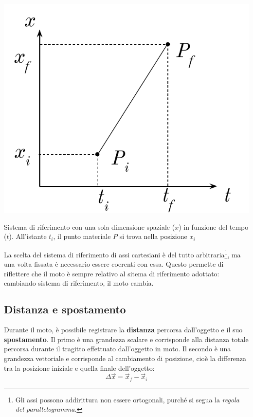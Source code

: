 \begin{marginfigure}
    \centering
    \includegraphics[width = \marginparwidth]{figures/puntomateriale.pdf}
    \caption{Sistema di riferimento con una sola dimensione spaziale ($x$)
    in funzione del tempo ($t$). All'istante $t_i$, il punto materiale $P$
    si trova nella posizione $x_i$}
    \label{point}
\end{marginfigure}

La scelta del sistema di riferimento di assi cartesiani è del tutto arbitraria\footnote{
Gli assi possono addirittura non essere ortogonali, purché si segua la \textit{regola del
parallelogramma}.}, ma una volta fissata è necessario essere coerenti con essa.
Questo permette di riflettere che il moto è sempre relativo al sitema di
riferimento adottato: cambiando sistema di riferimento, il moto cambia.


\subsection{Distanza e spostamento}
Durante il moto, è possibile registrare la \textbf{distanza} percorsa
dall'oggetto e il suo \textbf{spostamento}. Il primo è una grandezza
scalare e corrisponde alla distanza totale percorsa durante il tragitto
effettuato dall'oggetto in moto. Il secondo è una grandezza vettoriale e
corrisponde al cambiamento di posizione,
cioè la differenza tra la posizione iniziale e quella finale dell'oggetto:
\[ \Delta \overrightarrow{x} = \overrightarrow{x}_f - \overrightarrow{x}_i \]


